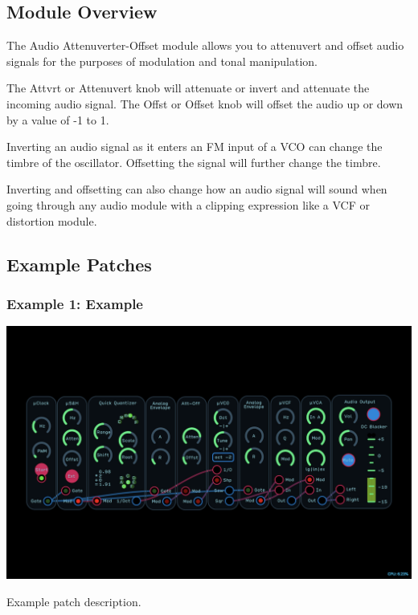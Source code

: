 \documentclass[11pt]{book}
\begin{document}
\begin{multicols*}{2}

\subsection*{Module Overview}

The Audio Attenuverter-Offset module allows you to attenuvert and offset audio signals for the purposes of modulation and tonal manipulation.

The Attvrt or Attenuvert knob will attenuate or invert and attenuate the incoming audio signal. The Offst or Offset knob will offset the audio up or down by a value of -1 to 1.

Inverting an audio signal as it enters an FM input of a VCO can change the timbre of the oscillator. Offsetting the signal will further change the timbre.

Inverting and offsetting can also change how an audio signal will sound when going through any audio module with a clipping expression like a VCF or distortion module.

\subsection*{Example Patches}

\subsubsection*{Example 1: Example}

\begin{center}
\includegraphics[width=0.95\linewidth]{attenuate-offset-fig4.png}
\end{center}

Example patch description.

\end{multicols*}
\end{document}
